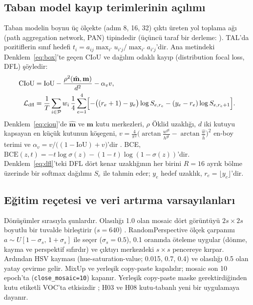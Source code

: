 \subsection{Taban model kayıp terimlerinin açılımı}\label{sec:ek-kayip}
Taban modelin boynu üç ölçekte (adım 8, 16, 32) çıktı üreten yol toplama ağı (path aggregation network, PAN) tipindedir (üçüncü taraf bir derleme: \cite{khanam_2024_yolov11overview}). TAL'da pozitiflerin sınıf hedefi $t_i=a_{ij}\max_{i'}u_{i'j}/\max_{i'}a_{i'j}$'dir. Ana metindeki Denklem~\eqref{eq:box}'te geçen CIoU \cite{zheng_2020_diou} ve dağılım odaklı kayıp (distribution focal loss, DFL) \cite{li_2020_gfl} şöyledir:
\begin{align}
\mathrm{CIoU}&=\mathrm{IoU}-\frac{\rho^2(\hat{\mathbf m},\mathbf m)}{d^2}-\alpha_v v,\label{eq:ciou}\\
\mathcal L_{\mathrm{dfl}}&=\frac1T\sum_{i\in\mathcal P}w_i\,\frac14\sum_{e=1}^{4}\Bigl[-\bigl((r_e+1)-y_e\bigr)\log S_{e,r_e}-(y_e-r_e)\log S_{e,r_e+1}\Bigr].\label{eq:dfl}
\end{align}
Denklem~\eqref{eq:ciou}'de $\hat{\mathbf m}$ ve $\mathbf m$ kutu merkezleri, $\rho$ Öklid uzaklığı, $d$ iki kutuyu kapsayan en küçük kutunun köşegeni, $v=\frac4{\pi^2}\bigl(\arctan\frac{w^{gt}}{h^{gt}}-\arctan\frac{\hat w}{\hat h}\bigr)^{2}$ en-boy terimi ve $\alpha_v=v/\bigl((1-\mathrm{IoU})+v\bigr)$'dir \cite{zheng_2020_diou}. BCE, $\mathrm{BCE}(z,t)=-t\log\sigma(z)-(1-t)\log(1-\sigma(z))$'dir. Denklem~\eqref{eq:dfl}'teki DFL \cite{li_2020_gfl} dört kenar uzaklığının her birini $R=16$ ayrık bölme üzerinde bir softmax dağılımı $S_e$ ile tahmin eder; $y_e$ hedef uzaklık, $r_e=\lfloor y_e\rfloor$'dir.

\subsection{Eğitim reçetesi ve veri artırma varsayılanları}\label{sec:ek-recete}
Dönüşümler sırasıyla şunlardır. Olasılığı 1.0 olan mosaic dört görüntüyü $2s\times2s$ boyutlu bir tuvalde birleştirir ($s=640$) \cite{bochkovskiy_2020_yolov4}. RandomPerspective ölçek çarpanını $a\sim U[1-\sigma_s,\,1+\sigma_s]$ ile seçer ($\sigma_s=0.5$), 0.1 oranında öteleme uygular (dönme, kayma ve perspektif sıfırdır) ve çıktıyı merkezdeki $s\times s$ pencereye kırpar. Ardından HSV kayması (hue-saturation-value; 0.015, 0.7, 0.4) ve olasılığı 0.5 olan yatay çevirme gelir. MixUp ve yerleşik copy-paste kapalıdır; mosaic son 10 epoch'ta (\texttt{close\_mosaic=10}) kapanır. Yerleşik copy-paste maske gerektirdiğinden kutu etiketli VOC'ta etkisizdir \cite{ultralytics_2026_augdocs}; H03 ve H08 kutu-tabanlı yeni bir uygulamaya dayanır.

